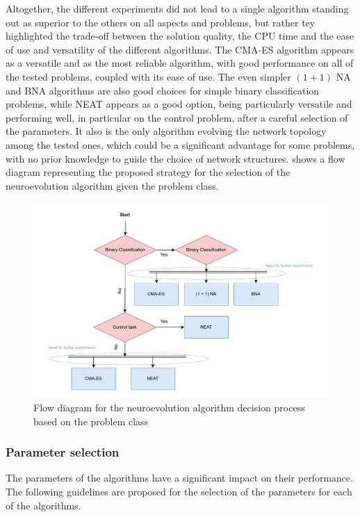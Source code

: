 Altogether, the different experiments did not lead to a single algorithm standing out as superior to the others on all aspects and problems, but rather tey highlighted the trade-off between the
solution quality, the CPU time and the ease of use and versatility of the different algorithms. The CMA-ES algorithm appears as a versatile and as the most reliable algorithm, with good performance
on all of the tested problems, coupled with its ease of use. The even simpler $(1 + 1)$ NA and BNA algorithms are also good choices for simple binary classification problems, while NEAT appears as a good
option, being particularly versatile and performing well, in particular on the control problem, after a careful selection of the parameters. It also is the only algorithm evolving the network topology among the
tested ones, which could be a significant advantage for some problems, with no prior knowledge to guide the choice of network structures.
 shows a flow diagram representing the proposed strategy for the selection of the neuroevolution algorithm given the problem class.

\begin{figure}
    \centering
    \includegraphics[width=\textwidth]{Pictures/alg_choice}
    \caption{Flow diagram for the neuroevolution algorithm decision process based on the problem class}
    \label{fig:flowchart}
\end{figure}

\subsubsection{Parameter selection}

The parameters of the algorithms have a significant impact on their performance. The following guidelines are proposed for the selection of the parameters for each of the algorithms.

